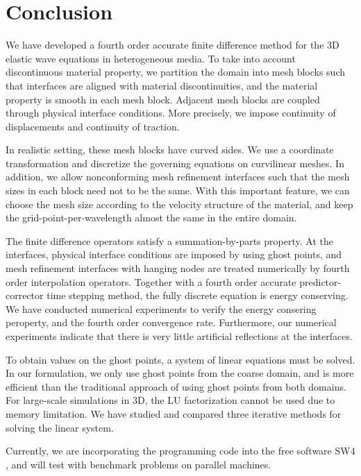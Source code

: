 \section{Conclusion}
We have developed a fourth order accurate finite difference method for the 3D elastic wave equations in heterogeneous media. To take into account discontinuous material property, we partition the domain into mesh blocks such that interfaces are aligned with material discontinuities, and the material property is smooth in each mesh block. Adjacent mesh blocks are coupled through physical interface conditions. More precisely, we impose continuity of displacements and continuity of traction. 

In realistic setting, these mesh blocks have curved sides. We use a coordinate transformation and discretize the governing equations on curvilinear meshes. In addition, we allow nonconforming mesh refinement  interfaces such that the mesh sizes in each block need not to be the same. With this important feature, we can choose the mesh size according to the velocity structure of the material, and keep the grid-point-per-wavelength almost the same in the entire domain. 

The finite difference operators satisfy a summation-by-parts property. At the interfaces, physical interface conditions are imposed by using ghost points, and mesh refinement interfaces with hanging nodes are treated numerically by fourth order interpolation operators. Together with a fourth order accurate predictor-corrector time stepping method, the fully discrete equation is energy conserving. We have conducted numerical experiments to verify the energy consering peroperty, and the fourth order convergence rate. Furthermore, our numerical experiments indicate that there is very little artificial reflections at the interfaces.

To obtain values on the ghost points, a system of linear equations must be solved. In our formulation, we only use ghost points from the coarse domain, and is more efficient than the traditional approach of using ghost points from both domains.  For large-scale simulations in 3D, the LU factorization cannot be used due to memory limitation. We have studied and compared three iterative methods for solving the linear system.

Currently, we are incorporating the programming code into the free software SW4 \cite{SW4}, and will test with benchmark problems on parallel machines. 